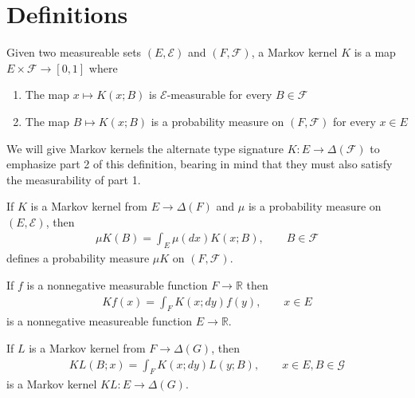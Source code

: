 \section{Definitions}
\begin{definition}
Given two measureable sets $(E,\mathcal{E})$ and $(F,\mathcal{F})$, a Markov kernel $K$ is a map $E\times \mathcal{F} \to [0,1]$ where
\begin{enumerate}
    \item The map $x\mapsto K(x;B)$ is $\mathcal{E}$-measurable for every $B\in\mathcal{F}$
    \item The map $B\mapsto K(x;B)$ is a probability measure on $(F,\mathcal{F})$ for every $x\in E$ 
\end{enumerate}

We will give Markov kernels the alternate type signature $K:E\to \Delta(\mathcal{F})$ to emphasize part 2 of this definition, bearing in mind that they must also satisfy the measurability of part 1.
\end{definition}

\begin{definition}\label{def:kernel_products}
If $K$ is a Markov kernel from $E\to \Delta(F)$ and $\mu$ is a probability measure on $(E,\mathcal{E})$, then
\begin{align}
    \mu K(B)=\int_E \mu(dx) K(x;B),\qquad B\in\mathcal{F}
\end{align}
defines a probability measure $\mu K$ on $(F,\mathcal{F})$.

If $f$ is a nonnegative measurable function $F\to \mathbb{R}$ then
\begin{align}
    Kf(x) = \int_F K(x;dy)f(y), \qquad x\in E
\end{align}
is a nonnegative measureable function $E\to \mathbb{R}$.

If $L$ is a Markov kernel from $F\to \Delta(G)$, then
\begin{align}
    KL(B;x) = \int_F K(x;dy) L(y;B),\qquad x\in E, B\in \mathcal{G}
\end{align}
is a Markov kernel $KL:E\to \Delta(G)$. \cite{cinlar_probability_2011}
\end{definition}
